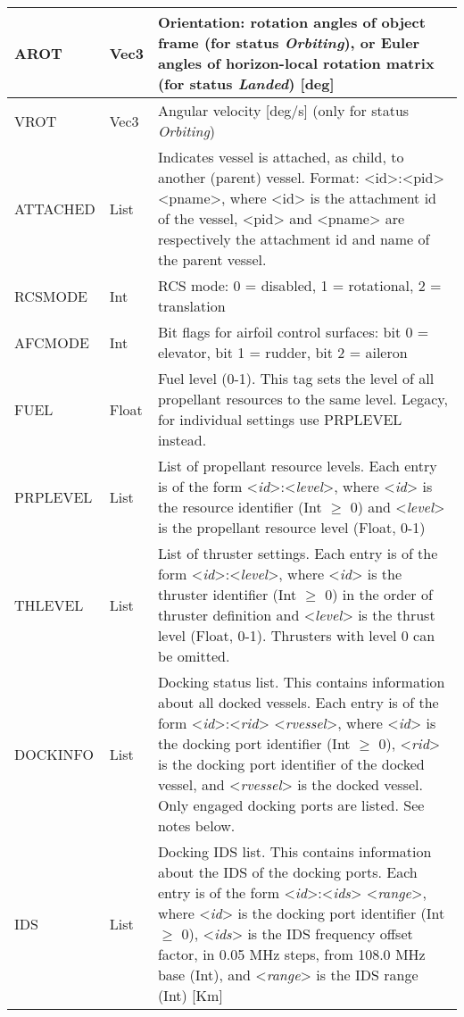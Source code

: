 \documentclass[Orbiter Developer Manual.tex]{subfiles}
\begin{document}
\begin{longtable}{ |p{}|p{}|p{}| }
	\hline\rule{0pt}{2ex}
	AROT & Vec3 & Orientation: rotation angles of object frame (for status \textit{Orbiting}), or Euler angles of horizon-local rotation matrix (for status \textit{Landed}) [deg]\\
	\hline\rule{0pt}{2ex}
	VROT & Vec3 & Angular velocity [deg/s] (only for status \textit{Orbiting})\\
	\hline\rule{0pt}{2ex}
	ATTACHED & List & Indicates vessel is attached, as child, to another (parent) vessel. Format: <id>:<pid><pname>, where <id> is the attachment id of the vessel, <pid> and <pname> are respectively the attachment id and name of the parent vessel.\\
	\hline\rule{0pt}{2ex}
	RCSMODE & Int & RCS mode: 0 = disabled, 1 = rotational, 2 = translation\\
	\hline\rule{0pt}{2ex}
	AFCMODE & Int & Bit flags for airfoil control surfaces: bit 0 = elevator, bit 1 = rudder, bit 2 = aileron\\
	\hline\rule{0pt}{2ex}
	FUEL & Float & Fuel level (0-1). This tag sets the level of all propellant resources to the same level. Legacy, for individual settings use PRPLEVEL instead.\\
	\hline\rule{0pt}{2ex}
	PRPLEVEL & List & List of propellant resource levels. Each entry is of the form <\textit{id}>:<\textit{level}>, where <\textit{id}> is the resource identifier (Int $\geq$ 0) and <\textit{level}> is the propellant resource level (Float, 0-1)\\
	\hline\rule{0pt}{2ex}
	THLEVEL & List & List of thruster settings. Each entry is of the form <\textit{id}>:<\textit{level}>, where <\textit{id}> is the thruster identifier (Int $\geq$ 0) in the order of thruster definition and <\textit{level}> is the thrust level (Float, 0-1). Thrusters with level 0 can be omitted.\\
	\hline\rule{0pt}{2ex}
	DOCKINFO & List & Docking status list. This contains information about all docked vessels. Each entry is of the form <\textit{id}>:<\textit{rid}> <\textit{rvessel}>, where <\textit{id}> is the docking port identifier (Int $\geq$ 0), <\textit{rid}> is the docking port identifier of the docked vessel, and <\textit{rvessel}> is the docked vessel. Only engaged docking ports are listed. See notes below.\\
	\hline\rule{0pt}{2ex}
	IDS & List & Docking IDS list. This contains information about the IDS of the docking ports. Each entry is of the form <\textit{id}>:<\textit{ids}> <\textit{range}>, where <\textit{id}> is the docking port identifier (Int $\geq$ 0), <\textit{ids}> is the IDS frequency offset factor, in 0.05 MHz steps, from 108.0 MHz base (Int), and <\textit{range}> is the IDS range (Int) [Km]\\

\end{longtable}
\end{document}
